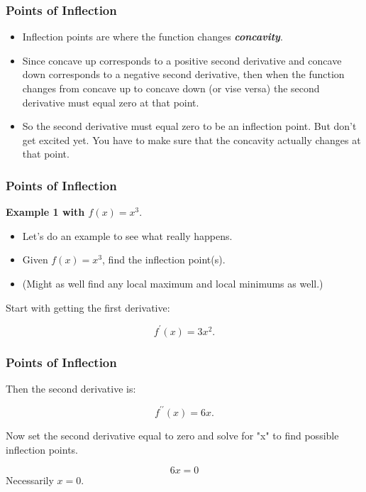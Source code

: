 \documentclass{beamer}
\begin{document}

\begin{frame}
	\frametitle{Points of Inflection}
	
	
	
	\begin{itemize}
		\item Inflection points are where the function changes \textbf{\textit{concavity}}.
		\item  Since concave up corresponds to a positive second derivative and concave down corresponds to a negative second derivative, then when the function changes from concave up to concave down (or vise versa) the second derivative must equal zero at that point. 
		\item So the second derivative must equal zero to be an inflection point. But don't get excited yet. You have to make sure that the concavity actually changes at that point.
	\end{itemize}

\end{frame}
\begin{frame}
	\frametitle{Points of Inflection}
	\textbf{Example 1 with $f(x) = x^3.$}
	\begin{itemize}
	\item Let's do an example to see what really happens. 
	\item Given $f(x) = x^3$, find the inflection point(s). \item (Might as well find any local maximum and local minimums as well.)
	\end{itemize}
	
	Start with getting the first derivative:
	
	\[f^{\prime}(x) = 3x^2.\]
	
\end{frame}
\begin{frame}
	\frametitle{Points of Inflection}
	
	Then the second derivative is:
	
	\[f^{\prime \prime}(x) = 6x.\]
	
	Now set the second derivative equal to zero and solve for "x" to find possible inflection points.
	
	\[ 6x = 0\]
	Necessarily $x=0$.
\end{frame}
\end{document}
